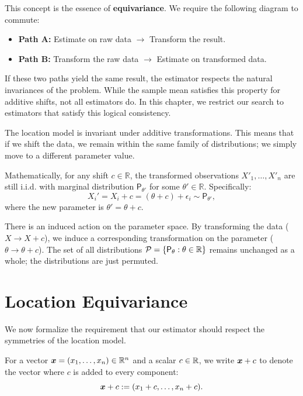 \begin{note}[Commutativity]
This concept is the essence of \textbf{equivariance}. We require the following diagram to commute:
\begin{itemize}
    \item \textbf{Path A:} Estimate on raw data $\to$ Transform the result.
    \item \textbf{Path B:} Transform the raw data $\to$ Estimate on transformed data.
\end{itemize}
If these two paths yield the same result, the estimator respects the natural invariances of the problem. While the sample mean satisfies this property for additive shifts, not all estimators do. In this chapter, we restrict our search to estimators that satisfy this logical consistency.
\end{note}

\label{par:invariance_model}
The location model is invariant under additive transformations. This means that if we shift the data, we remain within the same family of distributions; we simply move to a different parameter value.

Mathematically, for any shift \(c \in \mathbb{R}\), the transformed observations \(X'_1, \dots, X'_n\) are still i.i.d. with marginal distribution \(\mathsf{P}_{\theta'}\) for some \(\theta' \in \mathbb{R}\).
Specifically:
\[
X_i' = X_i + c = (\theta + c) + \epsilon_i \sim \mathsf{P}_{\theta'},
\]
where the new parameter is \(\theta' = \theta + c\).

\begin{note}
There is an induced action on the parameter space. By transforming the data (\(X \to X+c\)), we induce a corresponding transformation on the parameter (\(\theta \to \theta+c\)). The set of all distributions \(\mathcal{P} = \{ \mathsf{P}_\theta : \theta \in \mathbb{R} \}\) remains unchanged as a whole; the distributions are just permuted.
\end{note}

\section{Location Equivariance}
\label{sec:location_equivariance}

We now formalize the requirement that our estimator should respect the symmetries of the location model.

\begin{notation}[]
For a vector \(\boldsymbol{x} = (x_1, \dots, x_n) \in \mathbb{R}^n\) and a scalar \(c \in \mathbb{R}\), we write \(\boldsymbol{x} + c\) to denote the vector where \(c\) is added to every component:
\[
\boldsymbol{x} + c := (x_1 + c, \dots, x_n + c).
\]
\end{notation}

